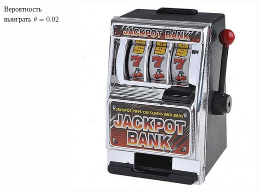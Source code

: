 \documentclass[fullscreen=true, bookmarks=true, hyperref={pdfencoding=unicode}]{beamer}
\begin{document}
\begin{frame}
\begin{columns}
\begin{column}{.25\paperwidth}
\begin{center}
        Вероятность выиграть $\theta = 0.02$
        \end{center}
      \end{column}
      \begin{column}{.25\paperwidth}
        \begin{center}
          \includegraphics[keepaspectratio,
                           width=.2\paperwidth]{data-kopilkabandit.jpg}


\end{center}
\end{column}
\end{columns}
\end{frame}
\end{document}
